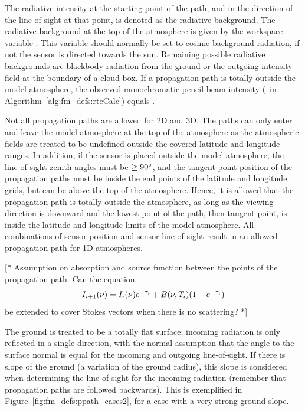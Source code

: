 The radiative intensity at the starting point of the path, and in the
direction of the line-of-sight at that point, is denoted as the
radiative background. The radiative background at the top of the
atmosphere is given by the workspace variable . This
variable should normally be set to cosmic background radiation, if
not the sensor is directed towards the sun. Remaining possible
radiative backgrounds are blackbody radiation from the ground or the
outgoing intensity field at the boundary of a cloud box. If a
propagation path is totally outside the model atmosphere, the
observed monochromatic pencil beam intensity (\MpiVct\ in
Algorithm~\ref{alg:fm_defs:rteCalc}) equals .

Not all propagation paths are allowed for 2D and 3D. The paths can
only enter and leave the model atmosphere at the top of the atmosphere
as the atmospheric fields are treated to be undefined outside the
covered latitude and longitude ranges. In addition, if the sensor is
placed outside the model atmosphere, the line-of-sight zenith angles
must be $\geq90^\circ$, and the tangent point position of the
propagation paths must be inside the end points of the latitude and
longitude grids, but can be above the top of the atmosphere. Hence, it
is allowed that the propagation path is totally outside the
atmosphere, as long as the viewing direction is downward and the
lowest point of the path, then tangent point, is inside the latitude
and longitude limits of the model atmosphere. All combinations of
sensor position and sensor line-of-sight result in an allowed
propagation path for 1D atmospheres. 


\label{sec:fm_defs:solverte}

[* Assumption on absorption and source function between the points of
the propagation path. Can the equation 
\begin{equation}
  I_{i+1}(\nu) = I_i(\nu)e^{-\tau_{i}} + B(\nu,T_{i})(1-e^{-\tau_{i}})
\end{equation}
be extended to cover Stokes vectors when there is no scattering? *]



\label{sec:fm_defs:groundrefl}

The ground is treated to be a totally flat surface; incoming radiation
is only reflected in a single direction, with the normal assumption
that the angle to the surface normal is equal for the incoming and
outgoing line-of-sight. If there is slope of the ground (a variation of the ground radius), this slope is considered
when determining the line-of-sight for the incoming radiation
(remember that propagation paths are followed backwards). This is
exemplified in Figure~\ref{fig:fm_defs:ppath_cases2}, for a case with
a very strong ground slope.

